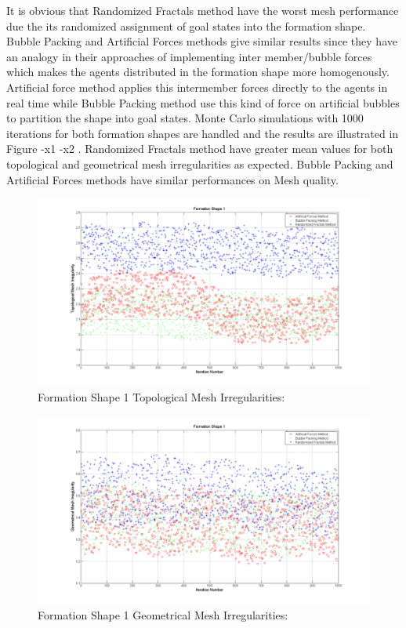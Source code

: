 \documentclass[twoside]{article}
\begin{document}
		It is obvious that Randomized Fractals method have the worst mesh performance due the its randomized assignment of goal states into the formation shape. Bubble Packing and Artificial Forces methods give similar results since they have an analogy in their approaches of implementing inter member/bubble forces which makes the agents distributed in the formation shape more homogenously. Artificial force method applies this intermember forces directly to the agents in real time while Bubble Packing method use this kind of force on artificial bubbles to partition the shape into goal states. Monte Carlo simulations with 1000 iterations for both formation shapes are handled and the results are illustrated in Figure -x1 -x2 . Randomized Fractals method have greater mean values for both topological and geometrical mesh irregularities as expected.  Bubble Packing and Artificial Forces methods have similar performances on Mesh quality.
		
		
		
								\begin{figure}[H]
									\caption{Formation Shape 1 Topological Mesh Irregularities:}
									\centerline{\includegraphics[scale = 0.45]{Topological_Irr_1}}
								\end{figure} 	
		
				\begin{figure}[H]
					\caption{Formation Shape 1 Geometrical Mesh Irregularities:}
					\centerline{\includegraphics[scale = 0.45]{Geometrical_Irr_1}}
				\end{figure} 	
\end{document}
